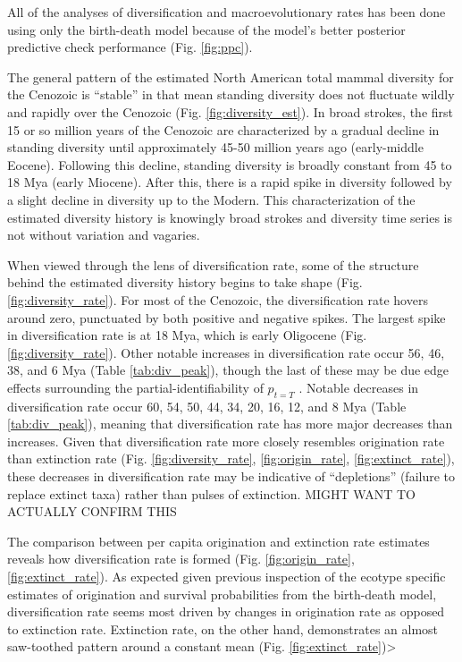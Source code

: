 \documentclass[12pt,letterpaper]{article}
\begin{document}
All of the analyses of diversification and macroevolutionary rates has been done using only the birth-death model because of the model's better posterior predictive check performance (Fig. \ref{fig:ppc}).


The general pattern of the estimated North American total mammal diversity for the Cenozoic is ``stable'' in that mean standing diversity does not fluctuate wildly and rapidly over the Cenozoic (Fig. \ref{fig:diversity_est}). In broad strokes, the first 15 or so million years of the Cenozoic are characterized by a gradual decline in standing diversity until approximately 45-50 million years ago (early-middle Eocene). Following this decline, standing diversity is broadly constant from 45 to 18 Mya (early Miocene). After this, there is a rapid spike in diversity followed by a slight decline in diversity up to the Modern. This characterization of the estimated diversity history is knowingly broad strokes and diversity time series is not without variation and vagaries.

When viewed through the lens of diversification rate, some of the structure behind the estimated diversity history begins to take shape (Fig. \ref{fig:diversity_rate}). For most of the Cenozoic, the diversification rate hovers around zero, punctuated by both positive and negative spikes. The largest spike in diversification rate is at 18 Mya, which is early Oligocene (Fig. \ref{fig:diversity_rate}). Other notable increases in diversification rate occur 56, 46, 38, and 6 Mya (Table \ref{tab:div_peak}), though the last of these may be due edge effects surrounding the partial-identifiability of \(p_{t = T}\) . Notable decreases in diversification rate occur 60, 54, 50, 44, 34, 20, 16, 12, and 8 Mya (Table \ref{tab:div_peak}), meaning that diversification rate has more major decreases than increases. Given that diversification rate more closely resembles origination rate than extinction rate (Fig. \ref{fig:diversity_rate}, \ref{fig:origin_rate}, \ref{fig:extinct_rate}), these decreases in diversification rate may be indicative of ``depletions'' (failure to replace extinct taxa) rather than pulses of extinction. \uppercase{might want to actually confirm this}

The comparison between per capita origination and extinction rate estimates reveals how diversification rate is formed (Fig. \ref{fig:origin_rate}, \ref{fig:extinct_rate}). As expected given previous inspection of the ecotype specific estimates of origination and survival probabilities from the birth-death model, diversification rate seems most driven by changes in origination rate as opposed to extinction rate. Extinction rate, on the other hand, demonstrates an almost saw-toothed pattern around a constant mean (Fig. \ref{fig:extinct_rate})>
\end{document}
